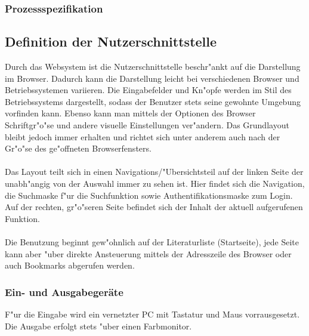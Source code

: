 \subsubsection{Prozessspezifikation}






\subsection{Definition der Nutzerschnittstelle}

Durch das Websystem ist die Nutzerschnittstelle beschr"ankt auf die Darstellung im Browser. Dadurch kann die Darstellung
leicht bei verschiedenen Browser und Betriebssystemen variieren. Die Eingabefelder und Kn"opfe werden im Stil des 
Betriebssystems dargestellt, sodass der Benutzer stets seine gewohnte Umgebung vorfinden kann. Ebenso kann man mittels der Optionen
des Browser Schriftgr"o"se und andere visuelle Einstellungen ver"andern. Das Grundlayout bleibt jedoch immer erhalten
und richtet sich unter anderem auch nach der Gr"o"se des ge"offneten Browserfensters.\\
\\
Das Layout teilt sich in einen Navigations/"Ubersichtsteil auf der linken Seite der unabh"angig von der Auswahl immer
zu sehen ist. Hier findet sich die Navigation, die Suchmaske f"ur die Suchfunktion sowie Authentifikationsmaske zum Login.
Auf der rechten, gr"o"seren Seite befindet sich der Inhalt der aktuell aufgerufenen Funktion.\\
\\
Die Benutzung beginnt gew"ohnlich auf der Literaturliste (Startseite), jede Seite kann aber "uber direkte
Ansteuerung mittels der Adresszeile des Browser oder auch Bookmarks abgerufen werden.\\

\subsubsection{Ein- und Ausgabegeräte}
F"ur die Eingabe wird ein vernetzter PC mit Tastatur und Maus vorrausgesetzt.\\
Die Ausgabe erfolgt stets "uber einen Farbmonitor.
\newpage
